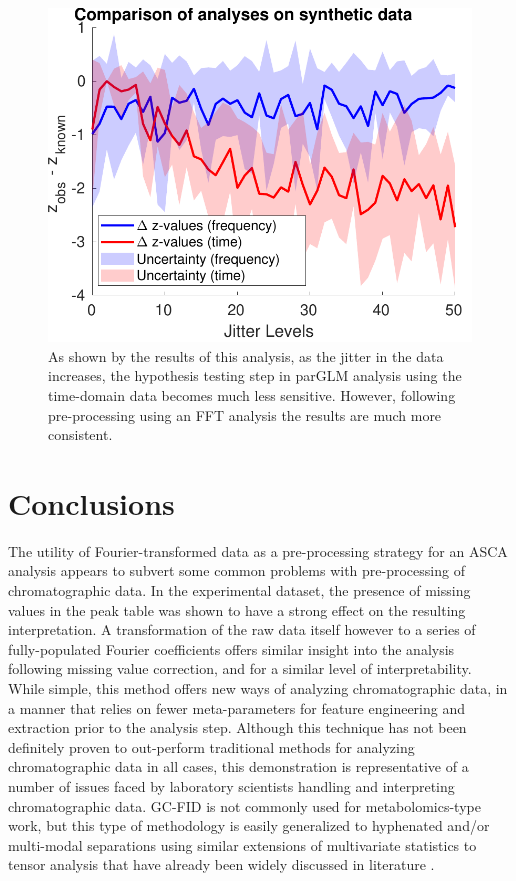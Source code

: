 \documentclass[preprint,12pt]{elsarticle}
\begin{document}
\begin{figure}[hbt!]
    \centering
    \includegraphics[width=0.9\linewidth]{figures/comparison.pdf}
    \caption{As shown by the results of this analysis, as the jitter in the data increases, the hypothesis testing step in parGLM analysis using the time-domain data becomes much less sensitive. However, following pre-processing using an FFT analysis the results are much more consistent.}
    \label{fig:compare}
\end{figure}

\section{Conclusions}

The utility of Fourier-transformed data as a pre-processing strategy for an ASCA analysis appears to subvert some common problems with pre-processing of chromatographic data. In the experimental dataset, the presence of missing values in the peak table was shown to have a strong effect on the resulting interpretation. A transformation of the raw data itself however to a series of fully-populated Fourier coefficients offers similar insight into the analysis following missing value correction, and for a similar level of interpretability. While simple, this method offers new ways of analyzing chromatographic data, in a manner that relies on fewer meta-parameters for feature engineering and extraction prior to the analysis step. Although this technique has not been definitely proven to out-perform traditional methods for analyzing chromatographic data in all cases, this demonstration is representative of a number of issues faced by laboratory scientists handling and interpreting chromatographic data. GC-FID is not commonly used for metabolomics-type work, but this type of methodology is easily generalized to hyphenated and/or multi-modal separations using similar extensions of multivariate statistics to tensor analysis that have already been widely discussed in literature \cite{koleini2023complementary}. 
\end{document}
